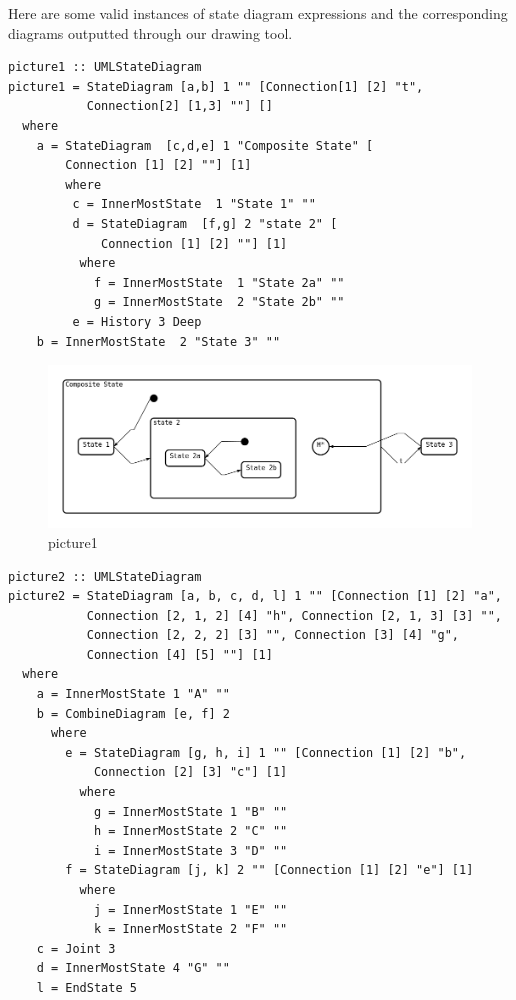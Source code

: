 Here are some valid instances of state diagram expressions and the corresponding diagrams outputted through our drawing tool.

\begin{verbatim}
picture1 :: UMLStateDiagram
picture1 = StateDiagram [a,b] 1 "" [Connection[1] [2] "t",
           Connection[2] [1,3] ""] []
  where
    a = StateDiagram  [c,d,e] 1 "Composite State" [
        Connection [1] [2] ""] [1]
        where
         c = InnerMostState  1 "State 1" ""
         d = StateDiagram  [f,g] 2 "state 2" [
             Connection [1] [2] ""] [1]
          where
            f = InnerMostState  1 "State 2a" ""
            g = InnerMostState  2 "State 2b" ""
         e = History 3 Deep
    b = InnerMostState  2 "State 3" ""
\end{verbatim}

\begin{figure}[ht]
    \centering
    \includegraphics[scale=0.40]{Bilder/picture4.png}
    \caption{picture1}
    \label{fig:picture1}
\end{figure}

\newpage
\begin{verbatim}
picture2 :: UMLStateDiagram
picture2 = StateDiagram [a, b, c, d, l] 1 "" [Connection [1] [2] "a",
           Connection [2, 1, 2] [4] "h", Connection [2, 1, 3] [3] "",
           Connection [2, 2, 2] [3] "", Connection [3] [4] "g",
           Connection [4] [5] ""] [1]
  where
    a = InnerMostState 1 "A" ""
    b = CombineDiagram [e, f] 2
      where
        e = StateDiagram [g, h, i] 1 "" [Connection [1] [2] "b", 
            Connection [2] [3] "c"] [1]
          where
            g = InnerMostState 1 "B" ""
            h = InnerMostState 2 "C" ""
            i = InnerMostState 3 "D" ""
        f = StateDiagram [j, k] 2 "" [Connection [1] [2] "e"] [1]
          where
            j = InnerMostState 1 "E" ""
            k = InnerMostState 2 "F" ""
    c = Joint 3
    d = InnerMostState 4 "G" ""
    l = EndState 5
\end{verbatim}
        
